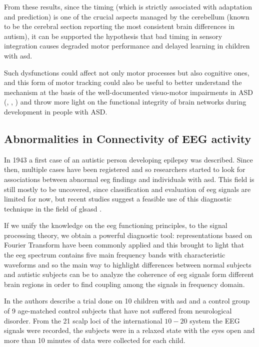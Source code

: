 \documentclass[12pt,journal,draftclsnofoot,onecolumn]{IEEEtran}
\makeatletter
\let\origsubsubsection\subsubsection
\renewcommand\subsubsection{\@ifstar{\starsubsubsection}{\nostarsubsubsection}}
\newcommand\nostarsubsubsection[1]
{\subsubsectionprelude\origsubsubsection{#1}}
\newcommand\subsubsectionprelude{%
  \vspace{6pt}
}
\makeatother
\begin{document}
From these results, since the timing (which is strictly associated with adaptation and prediction) is one of the crucial aspects managed by the cerebellum (known to be the cerebral section reporting the most consistent brain differences in autism), it can be supported the hypothesis that bad timing in sensory integration causes degraded motor performance and delayed learning in children with \gls{asd}.

Such dysfunctions could affect not only motor processes but also cognitive ones, and this form of motor tracking could also be useful to better understand the mechanism at the basis of the well-documented visuo-motor impairments in ASD (\cite{Chow2010}, \cite{Green2013}, \cite{Papa}) and throw more light on the functional integrity of brain networks during development in people with ASD.

\subsection{Abnormalities in Connectivity of EEG activity}
\label{sec:EEG}

In 1943 a first case of an autistic person developing epilepsy was described. Since then, multiple cases have been registered and so researchers started to look for associations between abnormal \gls{eeg} findings and individuals with \gls{asd}. This field is still mostly to be uncovered, since classification and evaluation of \gls{eeg} signals are limited for now, but recent studies suggest a feasible use of this diagnostic technique in the field of gls{asd} \cite{Behnam2008}.

If we unify the knowledge on the \gls{eeg} functioning principles, to the signal processing theory, we obtain a powerful diagnostic tool: representations based on Fourier Transform have been commonly applied and this brought to light that the \gls{eeg} spectrum contains five main frequency bands with characteristic waveforms and so the main way to highlight differences between normal subjects and autistic subjects can be to analyze the coherence of \gls{eeg} signals form different brain regions in order to find coupling among the signals in frequency domain.

\subsubsection{Example of procedure}
\label{sec:procEEG}

In \cite{Behnam2008} the authors describe a trial done on 10 children with \gls{asd} and a control group of 9 age-matched control subjects that have not suffered from neurological disorder. From the 21 scalp loci of the international $10 - 20$ system the EEG signals were recorded, the subjects were in a relaxed state with the eyes open and more than 10 minutes of data were collected for each child. 
\end{document}
